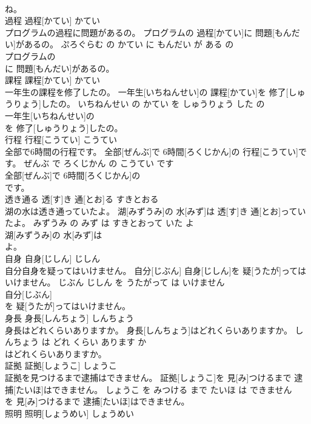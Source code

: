 \documentclass[8pt]{extreport}
\begin{document}
\begin{CJK}{UTF8}{min}
\\	ね。			
\\	過程	過程[かてい]	かてい	
\\	プログラムの過程に問題があるの。	プログラムの 過程[かてい]に 問題[もんだい]があるの。	ぷろぐらむ の かてい に もんだい が ある の	
\\	プログラムの
\\	に 問題[もんだい]があるの。			
\\	課程	課程[かてい]	かてい	
\\	一年生の課程を修了したの。	一年生[いちねんせい]の 課程[かてい]を 修了[しゅうりょう]したの。	いちねんせい の かてい を しゅうりょう した の	
\\	一年生[いちねんせい]の
\\	を 修了[しゅうりょう]したの。			
\\	行程	行程[こうてい]	こうてい	
\\	全部で6時間の行程です。	全部[ぜんぶ]で 6時間[ろくじかん]の 行程[こうてい]です。	ぜんぶ で ろくじかん の こうてい です	
\\	全部[ぜんぶ]で 6時間[ろくじかん]の
\\	です。			
\\	透き通る	透[す]き 通[とお]る	すきとおる	
\\	湖の水は透き通っていたよ。	湖[みずうみ]の 水[みず]は 透[す]き 通[とお]っていたよ。	みずうみ の みず は すきとおって いた よ	
\\	湖[みずうみ]の 水[みず]は
\\	よ。			
\\	自身	自身[じしん]	じしん	
\\	自分自身を疑ってはいけません。	自分[じぶん] 自身[じしん]を 疑[うたが]ってはいけません。	じぶん じしん を うたがって は いけません	
\\	自分[じぶん]
\\	を 疑[うたが]ってはいけません。			
\\	身長	身長[しんちょう]	しんちょう	
\\	身長はどれくらいありますか。	身長[しんちょう]はどれくらいありますか。	しんちょう は どれ くらい あります か	
\\	はどれくらいありますか。			
\\	証拠	証拠[しょうこ]	しょうこ	
\\	証拠を見つけるまで逮捕はできません。	証拠[しょうこ]を 見[み]つけるまで 逮捕[たいほ]はできません。	しょうこ を みつける まで たいほ は できません	
\\	を 見[み]つけるまで 逮捕[たいほ]はできません。			
\\	照明	照明[しょうめい]	しょうめい	

\end{CJK}
\end{document}

